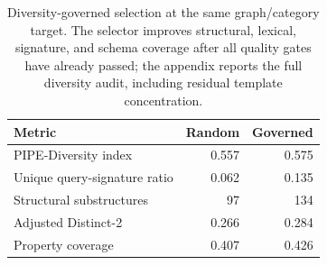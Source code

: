 \begin{table}[H]
\centering
\small
\begin{tabular}{lrr}
\toprule
Metric & Random & Governed \\
\midrule
PIPE-Diversity index & 0.557 & 0.575 \\
Unique query-signature ratio & 0.062 & 0.135 \\
Structural substructures & 97 & 134 \\
Adjusted Distinct-2 & 0.266 & 0.284 \\
Property coverage & 0.407 & 0.426 \\
\bottomrule
\end{tabular}
\caption{Diversity-governed selection at the same graph/category target. The selector improves structural, lexical, signature, and schema coverage after all quality gates have already passed; the appendix reports the full diversity audit, including residual template concentration.}
\label{tab:diversity_main}
\end{table}
